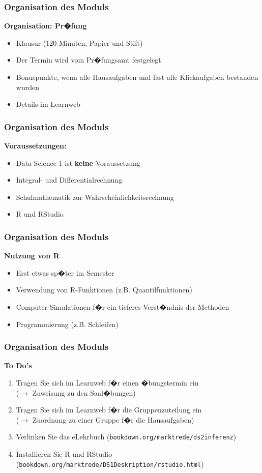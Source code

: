 \documentclass[12pt,show notes]{beamer}
\begin{document}
\begin{frame}
\frametitle{Organisation des Moduls}
\textbf{Organisation: Pr�fung}\medskip
\begin{itemize}
\item Klausur (120 Minuten, Papier-und-Stift)
\item Der Termin wird vom Pr�fungsamt festgelegt
\item Bonuspunkte, wenn alle Hausaufgaben und fast alle Klickaufgaben 
bestanden wurden
\item Details im Learnweb
\end{itemize}
\end{frame}

\begin{frame}
\frametitle{Organisation des Moduls}
\textbf{Voraussetzungen:}\medskip
\begin{itemize}
\item Data Science 1 ist \textbf{keine} Voraussetzung
\item Integral- und Differentialrechnung
\item Schulmathematik zur Wahrscheinlichkeitsrechnung
\item R und RStudio
\end{itemize}
\end{frame}

\begin{frame}
\frametitle{Organisation des Moduls}
\textbf{Nutzung von R}\medskip
\begin{itemize}
\item Erst etwas sp�ter im Semester
\item Verwendung von R-Funktionen (z.B. Quantilfunktionen)
\item Computer-Simulationen f�r ein tieferes Verst�ndnis der Methoden
\item Programmierung (z.B. Schleifen)
\end{itemize}
\end{frame}

\begin{frame}
\frametitle{Organisation des Moduls}
\textbf{To Do's}\medskip
\begin{enumerate}
\item Tragen Sie sich im Learnweb f�r einen �bungstermin ein\\
($\longrightarrow$ Zuweisung zu den Saal�bungen)
\item Tragen Sie sich im Learnweb f�r die Gruppenzuteilung ein\\
($\longrightarrow$ Zuordnung zu einer Gruppe f�r die Hausaufgaben)
\item Verlinken Sie das eLehrbuch 
{\footnotesize (\texttt{bookdown.org/marktrede/ds2inferenz})}
\item Installieren Sie R und RStudio
{\footnotesize (\texttt{bookdown.org/marktrede/DS1Deskription/rstudio.html})}
\end{enumerate}
\end{frame}
\end{document}
